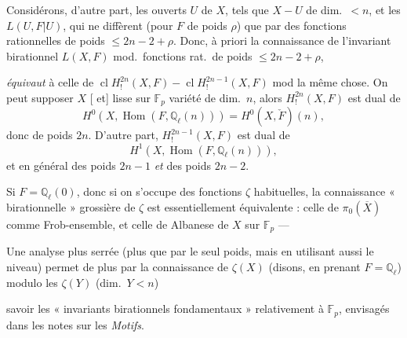 \documentclass[11pt,a4paper]{article}
\begin{document}

Considérons, d'autre part, les ouverts  $U$ de $X$, tels
que $X - U$ de dim.\ $< n$, et les $L(U, F|U)$, qui ne diffèrent
 (pour $F$  de poids $\rho$) que par des fonctions
rationnelles de poids $\leqslant 2n - 2 + \rho$. Donc, à priori la connaissance
de l'invariant birationnel $L(X, F)$ mod.\ fonctions rat.\ de poids
$\leqslant 2n - 2 + \rho$,

\emph{équivaut} à celle de $\operatorname{cl} H^{2n}_{!}(X, F) -
\operatorname{cl} H^{2n-1}_{!}(X, F)$ mod la même chose. On peut
supposer $X$ [ et] lisse sur $\mathbb{F}_{p}$ variété
de dim.\ $n$, alors $H^{2n}_{!}(X, F)$ est dual de
\[
  H^{0}(X, \operatorname{Hom}(F, \mathbb{Q}_{\ell}(n))) = H^{0}(X, \check{F})(n) ,
\]
donc  de poids $2n$. D'autre part,
$H^{2n-1}_{!}(X, F)$ est dual de
\[
  H^{1}(X, \operatorname{Hom}(F, \mathbb{Q}_{\ell}(n))) ,
\]
et  en général des poids $2n-1$ \emph{et} des poids $2n-2$.

 Si $F = \mathbb{Q}_{\ell}(0)$, \struck{\ill{}} donc
\struck{\ill{}} si on s'occupe des fonctions $\zeta$ habituelles, la connaissance
« birationnelle » grossière de $\zeta$ est essentiellement équivalente : celle de
$\pi_{0}(\overline{X})$ comme Frob-ensemble, et celle de
Albanese de $X$ sur $\mathbb{F}_{p}$ ---

Une analyse plus serrée  (plus  que par le
seul poids, mais en utilisant aussi le niveau) permet de 
plus par la connaissance de $\zeta(X)$ (disons, en prenant $F =
\mathbb{Q}_{\ell}$) modulo les $\zeta(Y)$ \struck{\ill{}} (dim.\ $Y < n$)

savoir les « invariants birationnels fondamentaux » relativement à
$\mathbb{F}_{p}$, envisagés dans les notes sur les \emph{Motifs}.
\end{document}
